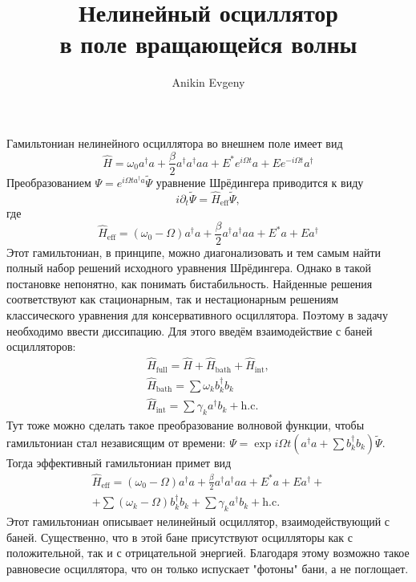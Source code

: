\documentclass{article}
\title{Нелинейный осциллятор\\ в поле вращающейся волны}
\author{Anikin Evgeny}
\begin{document}
\maketitle
Гамильтониан нелинейного осциллятора во внешнем поле имеет вид
\begin{equation}
   \hat{H} = \omega_0 a^\dagger a + \frac{\beta}{2} a^\dagger a^\dagger a a + 
                E^*e^{i\Omega t} a + Ee^{-i\Omega t} a^\dagger 
\end{equation}
Преобразованием $\Psi = e^{i\Omega t a^\dagger a} \widetilde{\Psi}$ уравнение Шрёдингера
приводится к виду
\begin{equation}
    i\partial_t \widetilde{\Psi} = \hat{H}_{\mathrm{eff}}\widetilde{\Psi},
\end{equation}
где 
\begin{equation}
    \hat{H}_{\mathrm{eff}} = (\omega_0 - \Omega) a^\dagger a + 
                        \frac{\beta}{2} a^\dagger a^\dagger a a + 
                E^* a + Ea^\dagger 
\end{equation}
Этот гамильтониан, в принципе, можно диагонализовать и тем самым найти полный набор решений
исходного уравнения Шрёдингера. Однако в такой постановке непонятно, как понимать
бистабильность. Найденные решения соответствуют как стационарным, так и нестационарным решениям
классического уравнения для консервативного осциллятора. Поэтому в задачу необходимо ввести
диссипацию. Для этого введём взаимодействие с баней осцилляторов:
\begin{equation}
    \begin{gathered}
        \hat{H}_{\mathrm{full}} = \hat{H} + \hat{H}_\mathrm{bath} + \hat{H}_\mathrm{int}, \\
        \hat{H}_\mathrm{bath} = \sum \omega_k b_k^\dagger b_k \\
        \hat{H}_\mathrm{int} = \sum \gamma_k a^\dagger b_k + \mathrm{h. c.}
    \end{gathered}
\end{equation}
Тут тоже можно сделать такое преобразование волновой функции, чтобы гамильтониан стал
независящим от времени: $\Psi = \exp{i\Omega t(a^\dagger a + 
\sum b_k^\dagger b_k)}\widetilde{\Psi}$. 
Тогда эффективный гамильтониан примет вид
\begin{multline}
    \hat{H}_\mathrm{eff} = (\omega_0 - \Omega) a^\dagger a + 
                        \frac{\beta}{2} a^\dagger a^\dagger a a + 
                E^* a + Ea^\dagger + \\
                + \sum (\omega_k - \Omega) b_k^\dagger b_k + 
                \sum \gamma_k a^\dagger b_k + \mathrm{h. c.}
\end{multline}
Этот гамильтониан описывает нелинейный осциллятор, взаимодействующий с баней. Существенно, 
что в этой бане присутствуют осцилляторы как с положительной, так и с отрицательной энергией.
Благодаря этому возможно такое равновесие осциллятора, что он только испускает "фотоны" бани,
а не поглощает. 
\end{document}
